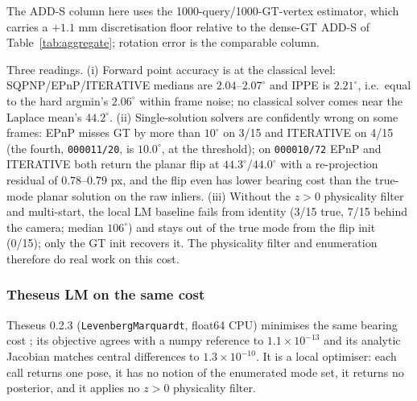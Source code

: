 The ADD-S column here uses the 1000-query/1000-GT-vertex estimator, which carries a $+1.1$ mm discretisation floor relative to the dense-GT ADD-S of Table~\ref{tab:aggregate}; rotation error is the comparable column.

Three readings. (i) Forward point accuracy is at the classical level: SQPNP/EPnP/ITERATIVE medians are $2.04$--$2.07^\circ$ and IPPE is $2.21^\circ$, i.e.\ equal to the hard argmin's $2.06^\circ$ within frame noise; no classical solver comes near the Laplace mean's $44.2^\circ$. (ii) Single-solution solvers are confidently wrong on some frames: EPnP misses GT by more than $10^\circ$ on 3/15 and ITERATIVE on 4/15 (the fourth, \texttt{000011/20}, is $10.0^\circ$, at the threshold); on \texttt{000010/72} EPnP and ITERATIVE both return the planar flip at $44.3^\circ$/$44.0^\circ$ with a re-projection residual of $0.78$--$0.79$ px, and the flip even has lower bearing cost than the true-mode planar solution on the raw inliers. (iii) Without the $z>0$ physicality filter and multi-start, the local LM baseline fails from identity (3/15 true, 7/15 behind the camera; median $106^\circ$) and stays out of the true mode from the flip init (0/15); only the GT init recovers it. The physicality filter and enumeration therefore do real work on this cost.

\subsubsection{Theseus LM on the same cost}\label{sec:theseus}

Theseus 0.2.3 (\texttt{LevenbergMarquardt}, float64 CPU) minimises the same bearing cost \cite{pineda2022theseus}; its objective agrees with a numpy reference to $1.1\times10^{-13}$ and its analytic Jacobian matches central differences to $1.3\times10^{-10}$. It is a local optimiser: each call returns one pose, it has no notion of the enumerated mode set, it returns no posterior, and it applies no $z>0$ physicality filter.

